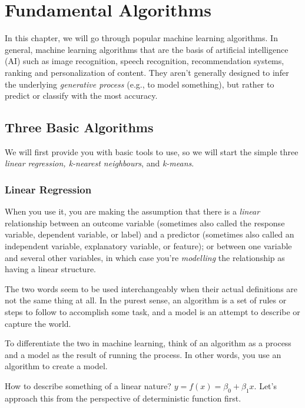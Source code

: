 \chapter{Fundamental Algorithms}
In this chapter, we will go through popular machine learning algorithms. In general, machine learning algorithms that are the basis of artificial intelligence (AI) such as image recognition, speech recognition, recommendation systems, ranking and personalization of content. They aren't generally designed to infer the underlying \textit{generative process} (e.g., to model something), but rather to predict or classify with the most accuracy.

\section{Three Basic Algorithms}
We will first provide you with basic tools to use, so we will start the simple three \textit{linear regression, k-nearest neighbours}, and \textit{k-means}.

\subsection{Linear Regression}
When you use it, you are making the assumption that there is a \textit{linear} relationship between an outcome variable (sometimes also called the response variable, dependent variable, or label) and a predictor (sometimes also called an independent variable, explanatory variable, or feature); or between one variable and several other variables, in which case you're \textit{modelling} the relationship as having a linear structure.

\begin{tcolorbox}[enhanced jigsaw, breakable, pad at break*=1mm, colback=gray!20!white, colframe=black!85!black, title=\textbf{Algorithm or a Model?}]
    The two words seem to be used interchangeably when their actual definitions are not the same thing at all. In the purest sense, an algorithm is a set of rules or steps to follow to accomplish some task, and a model is an attempt to describe or capture the world.

    To differentiate the two in machine learning, think of an algorithm as a process and a model as the result of running the process. In other words, you use an algorithm to create a model.
\end{tcolorbox}

How to describe something of a linear nature? \(y=f(x)=\beta_{0}+\beta_{1}x\). Let's approach this from the perspective of deterministic function first.

